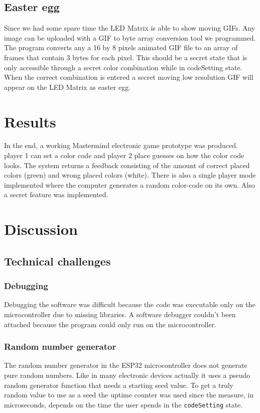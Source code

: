\documentclass[a4paper, 12pt]{article}
\begin{document}
\subsection{Easter egg}
Since we had some spare time the LED Matrix is able to show moving GIFs.
Any image can be uploaded with a GIF to byte array conversion tool we
programmed. The program converts any a 16 by 8 pixels animated GIF file
to an array of frames that contain 3 bytes for each pixel.
This should be a secret state that is only accessible through a secret
color combination while in codeSetting state. When the correct
combination is entered a secret moving low resolution GIF will appear on
the LED Matrix as easter egg.

\section{Results}
In the end, a working Mastermind electronic game prototype was produced.
player 1 can set a color code and player 2 place guesses on how the color code
looks. The system returns a feedback consisting of the amount of correct
placed colors (green) and wrong placed colors (white). There is also a single
player mode implemented where the computer generates a random color-code on
its own. Also a secret feature was implemented. 

\section{Discussion}
\subsection{Technical challenges}
\subsubsection{Debugging}
Debugging the software was difficult because the code was executable
only on the microcontroller due to missing libraries. A software
debugger couldn’t been attached because the program could only run on
the microcontroller. 

\subsubsection{Random number generator}
The random number generator in the ESP32 microcontroller does not
generate pure random numbers. Like in many electronic devices actually
it uses a pseudo random generator function that needs a starting seed
value. To get a truly random value to use as a seed the uptime counter
was used since the measure, in microseconds, depends on the time the
user spends in the {\tt codeSetting} state.
\end{document}
